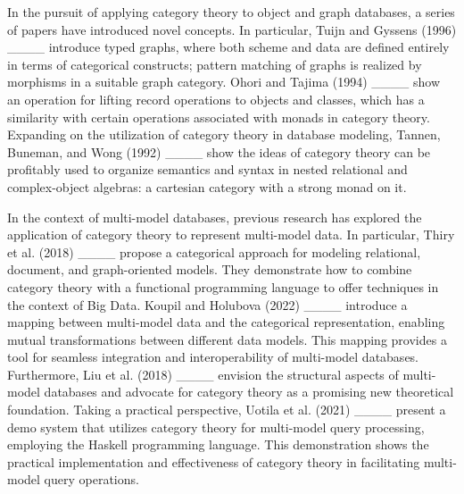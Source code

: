 In the pursuit of applying category theory to object and graph databases, a series of papers have  introduced novel concepts. In particular, Tuijn and Gyssens (1996) ____ introduce typed graphs, where both scheme and
data are defined entirely in terms of categorical constructs; pattern matching of graphs
is realized by morphisms in a suitable graph category.  Ohori and Tajima  (1994) ____ show an operation for lifting record operations to objects and classes, which has a similarity with
certain operations associated with monads in category theory. Expanding on the utilization of category theory in database modeling, Tannen, Buneman, and Wong (1992) ____ show the ideas of category theory can be profitably used to organize semantics and syntax in nested relational and complex-object algebras: a cartesian category with a strong monad on it. 




In the context of multi-model databases, previous research has explored the application of category theory to  represent multi-model data. In particular, Thiry et al. (2018) ____ propose a categorical approach for modeling relational, document, and graph-oriented models. They demonstrate how to combine category theory with a functional programming language to offer techniques in the context of Big Data. Koupil and Holubova (2022) ____ introduce a mapping between multi-model data and the categorical representation, enabling mutual transformations between different data models. This mapping provides a tool for seamless integration and interoperability of multi-model databases. Furthermore, Liu et al. (2018) ____ envision the structural aspects of multi-model databases and advocate for category theory as a promising new theoretical foundation. Taking a practical perspective, Uotila et al. (2021) ____ present a demo system that utilizes category theory for multi-model query processing, employing the Haskell programming language. This demonstration shows the practical implementation and effectiveness of category theory in facilitating multi-model query operations.


